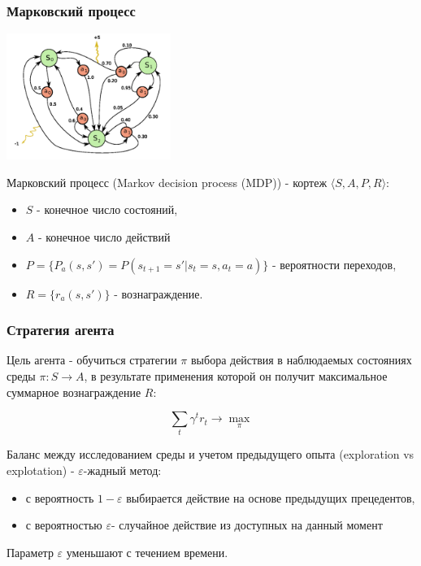 \documentclass[default]{beamer}
\begin{document}
	\begin{frame}
		\frametitle{Марковский процесс}
		
		\begin{center}
			\includegraphics[width=0.4\textwidth]{mdp.png}
		\end{center}
		\par\bigskip
		
		Марковский процесс (Markov decision process (MDP)) - кортеж $\langle S, A, P, R\rangle$:
		\begin{itemize}
			\item $S$ - конечное число состояний,
			\item $A$ - конечное число действий
			\item $P=\{P_a(s,s')=P(s_{t+1}=s'|s_t=s, a_t=a)\}$ - вероятности переходов,
			\item $R=\{r_a(s,s')\}$ - вознаграждение.
		\end{itemize}
		
		
	\end{frame}

	\begin{frame}
		\frametitle{Стратегия агента}

			Цель агента - обучиться стратегии $\pi$ выбора действия в наблюдаемых состояниях среды $\pi:S\to A$, в результате применения которой он получит максимальное суммарное вознаграждение $R$:
			
			\[
				\sum\limits_t\gamma^t r_t \rightarrow \max_\pi
			\] 
			\par\bigskip
			
			Баланс между исследованием среды и учетом предыдущего опыта (exploration vs explotation) - $\varepsilon$-жадный метод:
			\begin{itemize}
				\item с вероятность $1-\varepsilon$ выбирается действие на основе предыдущих прецедентов,
				\item с вероятностью $\varepsilon$- случайное действие из доступных на данный момент
			\end{itemize}
			Параметр $\varepsilon$ уменьшают с течением времени.
	\end{frame}
\end{document}
